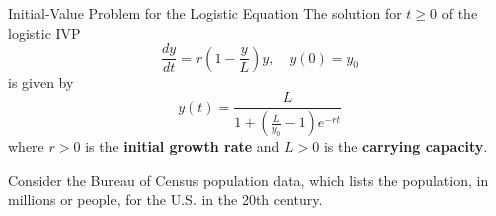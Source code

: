 \documentclass{beamer}
\begin{document}
\begin{frame}
\begin{block}{Initial-Value Problem for the Logistic Equation}
The solution for $t\geq 0$ of the logistic IVP
\begin{equation*}
\dfrac{dy}{dt} = r\left(1-\dfrac{y}{L}\right)y,\quad y(0)=y_0 
\end{equation*}
is given by
\begin{equation*}
y(t)=\dfrac{L}{1+\left(\tfrac{L}{y_0}-1\right)e^{-rt}}
\end{equation*}
where $r>0$ is the \textbf{initial growth rate} and $L>0$ is the \textbf{carrying capacity}.
\end{block}
\end{frame}

\begin{frame}
\begin{example}
\begin{overprint}
Consider the Bureau of Census population data, which lists the population, in millions or people, for the U.S. in the 20th century.
\begin{columns}
\begin{column}{0.7\linewidth}


\end{column}
\end{columns}
\end{overprint}
\end{example}
\end{frame}
\end{document}
